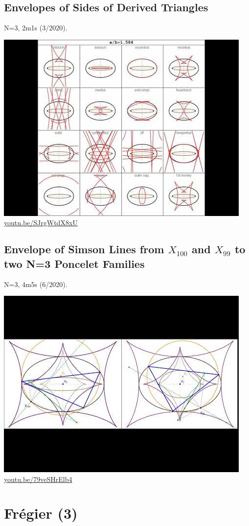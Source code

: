 \documentclass[12pt]{amsart}
\begin{document}
\subsection{Envelopes of Sides of Derived Triangles}
\label{vid:SJrgWtdX8xU}
\noindent N=3, 2m1s (3/2020). 
\begin{center}\includegraphics[width=.5\textwidth]{pics/SJrgWtdX8xU.jpg} \\ 
\href{https://youtu.be/SJrgWtdX8xU}{\url{youtu.be/SJrgWtdX8xU}}\end{center}
% 
\subsection{Envelope of Simson Lines from $X_{100}$ and $X_{99}$ to two N=3 Poncelet Families}
\label{vid:79veSHrElb4}
\noindent N=3, 4m5s (6/2020). 
\begin{center}\includegraphics[width=.5\textwidth]{pics/79veSHrElb4.jpg} \\ 
\href{https://youtu.be/79veSHrElb4}{\url{youtu.be/79veSHrElb4}}\end{center}
% 

\section{Frégier (3)}
\end{document}
